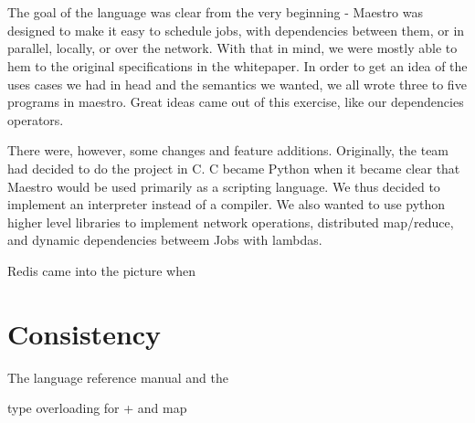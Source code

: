 \section{}
The goal of the language was clear from the very beginning - Maestro was designed to make it easy to schedule jobs, with dependencies between them, or in parallel, locally, or over the network.
With that in mind, we were mostly able to hem to the original specifications in the whitepaper.
In order to get an idea of the uses cases we had in head and the semantics we wanted, we all wrote three to five programs in maestro.
Great ideas came out of this exercise, like our dependencies operators.

There were, however, some changes and feature additions. Originally, the team had decided to do the project in C. C became Python when it became clear that Maestro would be used primarily as a scripting language. We thus decided to implement an interpreter instead of a compiler.
We also wanted to use python higher level libraries to implement network operations, distributed map/reduce, and dynamic dependencies betweem Jobs with lambdas.

Redis came into the picture when 


\section{Consistency}
The language reference manual and the












type overloading for + and map
